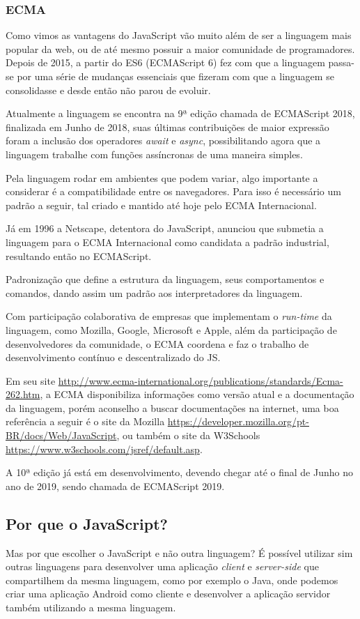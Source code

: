 \documentclass[
	12pt,				%
	openright,			%
	twoside,			%
	a4paper,			%
	english,			%
	brazil				%
	]{abntex2}
\begin{document}
\subsubsection{ECMA}

Como vimos as vantagens do JavaScript vão muito além de ser a linguagem mais popular da web, ou de até mesmo possuir a maior comunidade de programadores. Depois de 2015, a partir do ES6 (ECMAScript 6) fez com que a linguagem passa-se por uma série de mudanças essenciais que fizeram com que a linguagem se consolidasse e desde então não parou de evoluir.

Atualmente a linguagem se encontra na 9ª edição chamada de ECMAScript 2018, finalizada em Junho de 2018, suas últimas contribuições de maior expressão foram a inclusão dos operadores \textit{await} e \textit{async}, possibilitando agora que a linguagem trabalhe com funções assíncronas de uma maneira simples.

Pela linguagem rodar em ambientes que podem variar, algo importante a considerar é a compatibilidade entre os navegadores. Para isso é necessário um padrão a seguir, tal criado e mantido até hoje pelo ECMA Internacional.

Já em 1996 a Netscape, detentora do JavaScript, anunciou que submetia a linguagem para o ECMA Internacional como candidata a padrão industrial, resultando então no ECMAScript.

Padronização que define a estrutura da linguagem, seus comportamentos e comandos, dando assim um padrão aos interpretadores da linguagem. 

Com participação colaborativa de empresas que implementam o \textit{run-time} da linguagem, como Mozilla, Google, Microsoft e Apple, além da participação de desenvolvedores da comunidade, o ECMA coordena e faz o trabalho de desenvolvimento contínuo e descentralizado do JS.

Em seu site \url{http://www.ecma-international.org/publications/standards/Ecma-262.htm}, a ECMA disponibiliza informações como versão atual e a documentação da linguagem, porém aconselho a buscar documentações na internet, uma boa referência a seguir é o site da Mozilla \url{https://developer.mozilla.org/pt-BR/docs/Web/JavaScript}, ou também o site da W3Schools \url{https://www.w3schools.com/jsref/default.asp}. 

A 10ª edição já está em desenvolvimento, devendo chegar até o final de Junho no ano de 2019, sendo chamada de ECMAScript 2019.

\subsection{Por que o JavaScript?}
Mas por que escolher o JavaScript e não outra linguagem? É possível utilizar sim outras linguagens para desenvolver uma aplicação \textit{client} e \textit{server-side} que compartilhem da mesma linguagem, como por exemplo o Java, onde podemos criar uma aplicação Android como cliente e desenvolver a aplicação servidor também utilizando a mesma linguagem.
\end{document}
